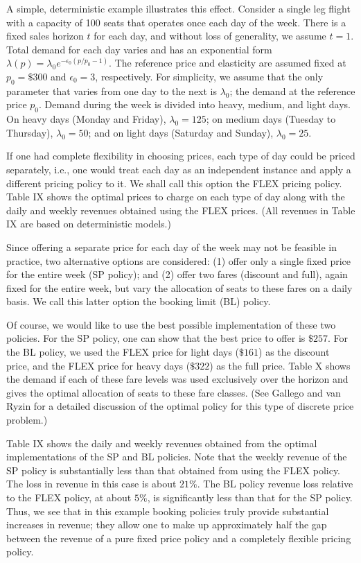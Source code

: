 A simple, deterministic example illustrates this effect. Consider a single leg flight with a capacity of 100 seats that operates once each day of the week. There is a fixed sales horizon \(t\) for each day, and without loss of generality, we assume \(t = 1\). Total demand for each day varies and has an exponential form \(\lambda(p) = \lambda_0 e^{-\epsilon_0 (p / p_0 - 1)}\). The reference price and elasticity are assumed fixed at \(p_0 = \$300\) and \(\epsilon_0 = 3\), respectively. For simplicity, we assume that the only parameter that varies from one day to the next is \(\lambda_0\); the demand at the reference price \(p_0\). Demand during the week is divided into heavy, medium, and light days. On heavy days (Monday and Friday), \(\lambda_0 = 125\); on medium days (Tuesday to Thursday), \(\lambda_0 = 50\); and on light days (Saturday and Sunday), \(\lambda_0 = 25\).

If one had complete flexibility in choosing prices, each type of day could be priced separately, i.e., one would treat each day as an independent instance and apply a different pricing policy to it. We shall call this option the FLEX pricing policy. Table IX shows the optimal prices to charge on each type of day along with the daily and weekly revenues obtained using the FLEX prices. (All revenues in Table IX are based on deterministic models.)

Since offering a separate price for each day of the week may not be feasible in practice, two alternative options are considered: (1) offer only a single fixed price for the entire week (SP policy); and (2) offer two fares (discount and full), again fixed for the entire week, but vary the allocation of seats to these fares on a daily basis. We call this latter option the booking limit (BL) policy.

Of course, we would like to use the best possible implementation of these two policies. For the SP policy, one can show that the best price to offer is \(\$257\). For the BL policy, we used the FLEX price for light days (\(\$161\)) as the discount price, and the FLEX price for heavy days (\(\$322\)) as the full price. Table X shows the demand if each of these fare levels was used exclusively over the horizon and gives the optimal allocation of seats to these fare classes. (See Gallego and van Ryzin for a detailed discussion of the optimal policy for this type of discrete price problem.)

Table IX shows the daily and weekly revenues obtained from the optimal implementations of the SP and BL policies. Note that the weekly revenue of the SP policy is substantially less than that obtained from using the FLEX policy. The loss in revenue in this case is about \(21\%\). The BL policy revenue loss relative to the FLEX policy, at about \(5\%\), is significantly less than that for the SP policy. Thus, we see that in this example booking policies truly provide substantial increases in revenue; they allow one to make up approximately half the gap between the revenue of a pure fixed price policy and a completely flexible pricing policy.

